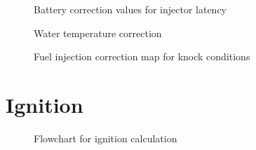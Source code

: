 \documentclass[11pt,a4paper]{book}
\begin{document}
\begin{figure}
    \centering
    \missingfigure{}
    \caption{Battery correction values for injector latency}
    \label{fig:}
\end{figure}

\begin{figure}
    \centering
    \missingfigure{}
    \caption{Water temperature correction}
    \label{fig:}
\end{figure}

\begin{figure}
    \centering
    \missingfigure{}
    \caption{Fuel injection correction map for knock conditions}
    \label{fig:}
\end{figure}
\section{Ignition}
\begin{figure}
    \centering
    
    \caption{Flowchart for ignition calculation}
    \label{fig:}
\end{figure}
\end{document}

